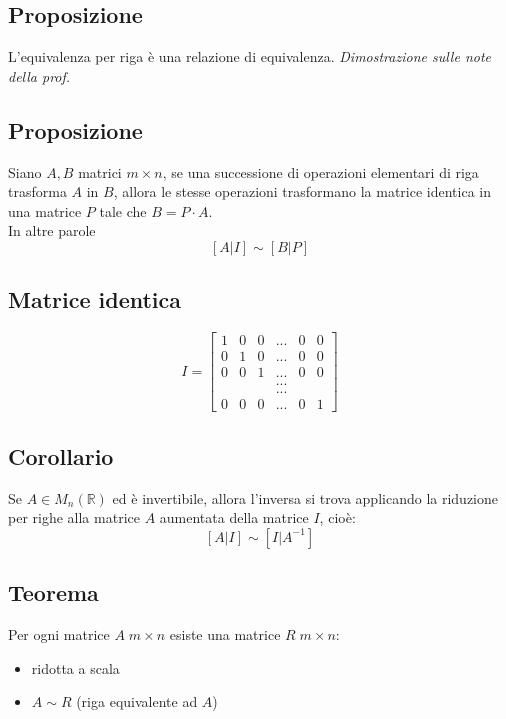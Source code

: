 \subsection{Proposizione}
L'equivalenza per riga è una relazione di equivalenza.
\textit{Dimostrazione sulle note della prof.}

\subsection{Proposizione}
Siano \(A, B\) matrici \(m\times n\), se una successione di operazioni elementari di riga trasforma \(A\) in \(B\), allora le stesse operazioni trasformano la matrice identica in una matrice \(P\) tale che \(B=P\cdot A\).
\\In altre parole
\[[A|I]\sim [B|P]\]

\subsection{Matrice identica}
\begin{equation*}
I = 
\begin{bmatrix}
1 & 0 & 0 & ... &0 & 0\\
0 & 1 & 0 & ... &0 & 0\\
0 & 0 & 1 & ... &0 & 0\\
& &&...\\
& &&...\\
0&0&0&... &0&1
\end{bmatrix}
\end{equation*}

\subsection{Corollario}
Se \(A\in M_n(\mathbb{R})\) ed è invertibile, allora l'inversa si trova applicando la riduzione per righe alla matrice \(A\) aumentata della matrice \(I\), cioè:
\[[A|I]\sim [I|A^{-1}]\]

\subsection{Teorema}
Per ogni matrice \(A\;m\times n\) esiste una matrice \(R\;m\times n\):
\begin{itemize}
	\item ridotta a scala
	\item \(A\sim R\) (riga equivalente ad \(A\))
\end{itemize}

